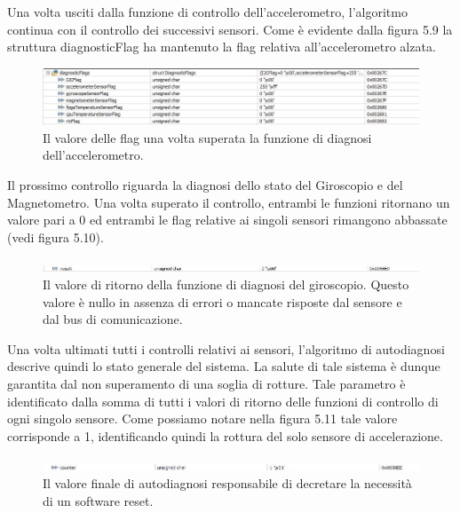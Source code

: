 \documentclass[LaM,binding=0.6cm]{../sapthesis}
\begin{document}
Una volta usciti dalla funzione di controllo dell'accelerometro, l'algoritmo continua con il controllo dei successivi sensori. Come è evidente dalla figura 5.9 la struttura diagnosticFlag ha mantenuto la flag relativa all'accelerometro alzata.
\newline
\begin{figure}[htbp]
\centerline{\includegraphics[scale=0.6]{examples/6_accelerometerIdBad.JPG}}
\caption{Il valore delle flag una volta superata la funzione di diagnosi dell'accelerometro.}
\label{fig}
\end{figure}

Il prossimo controllo riguarda la diagnosi dello stato del Giroscopio e del Magnetometro. Una volta superato il controllo, entrambi le funzioni ritornano un valore pari a 0 ed entrambi le flag relative ai singoli sensori rimangono abbassate (vedi figura 5.10).\newpage
\begin{figure}[htbp]
\centerline{\includegraphics[scale=0.6]{examples/7_GiroscopioResultGoodI2CAndGoodMagnetometerId.JPG}}
\caption{Il valore di ritorno della funzione di diagnosi del giroscopio. Questo valore è nullo in assenza di errori o mancate risposte dal sensore e dal bus di comunicazione.}
\label{fig}
\end{figure}

Una volta ultimati tutti i controlli relativi ai sensori, l'algoritmo di autodiagnosi descrive quindi lo stato generale del sistema. La salute di tale sistema è dunque garantita dal non superamento di una soglia di rotture. Tale parametro è identificato dalla somma di tutti i valori di ritorno delle funzioni di controllo di ogni singolo sensore. Come possiamo notare nella figura 5.11 tale valore corrisponde a 1, identificando quindi la rottura del solo sensore di accelerazione.\newline
\begin{figure}[htbp]
\centerline{\includegraphics[scale=0.6]{examples/8_giroscopioCounterRimaneAUno.JPG}}
\caption{Il valore finale di autodiagnosi responsabile di decretare la necessità di un software reset. }
\label{fig}
\end{figure}
\end{document}
